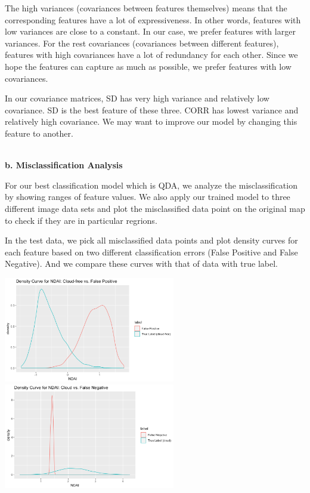 \documentclass[11pt]{article}
\begin{document}
The high variances (covariances between features themselves) means that the corresponding features have a lot of expressiveness. In other words, features with low variances are close to a constant. In our case, we prefer features with larger variances. For the rest covariances (covariances between different features), features with high covariances have a lot of redundancy for each other. Since we hope the features can capture as much as possible, we prefer features with low covariances.

In our covariance matrices, SD has very high variance and relatively low covariance. SD is the best feature of these three. CORR has lowest variance and relatively high covariance. We may want to improve our model by changing this feature to another.

\vspace{0.3cm}
\mbox{}\\
\textbf{b. Misclassification Analysis}

For our best classification model which is QDA, we analyze the misclassification by showing ranges of feature values. We also apply our trained model to three different image data sets and plot the misclassified data point on the original map to check if they are in particular regrions.

In the test data, we pick all misclassified data points and plot density curves for each feature based on two different classification errors (False Positive and False Negative). And we compare these curves with that of data with true label.

\includegraphics[width = 7.5cm]{4(b)NDAI1}
\includegraphics[width = 7.5cm]{4(b)NDAI2}
\end{document}
